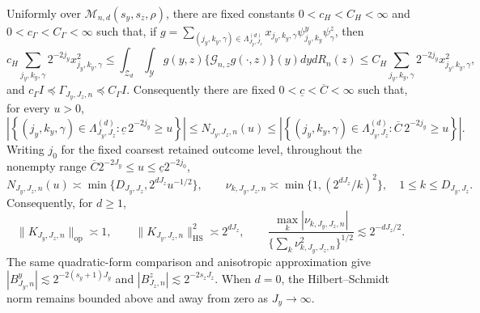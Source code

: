 Uniformly over \(\mathcal M_{n,d}(s_y,s_z,\rho)\), there are fixed constants \(0<c_H<C_H<\infty\) and \(0<c_\Gamma<C_\Gamma<\infty\) such that, if \(g=\sum_{(j_y,k_y,\gamma)\in\Lambda_{J_y,J_z}^{(d)}}x_{j_y,k_y,\gamma}\psi^y_{j_y,k_y}\psi^z_\gamma\), then
\[
c_H\sum_{j_y,k_y,\gamma}2^{-2j_y}x_{j_y,k_y,\gamma}^2
\le\int_{\mathcal Z_d}\int_{\mathcal Y}g(y,z)\{\mathcal G_{n,z}g(\cdot,z)\}(y)dydR_n(z)
\le C_H\sum_{j_y,k_y,\gamma}2^{-2j_y}x_{j_y,k_y,\gamma}^2,
\]
and \(c_\Gamma I\preceq\Gamma_{J_y,J_z,n}\preceq C_\Gamma I\). Consequently there are fixed \(0<\underline c<\overline C<\infty\) such that, for every \(u>0\),
\[
\left|\left\{(j_y,k_y,\gamma)\in\Lambda_{J_y,J_z}^{(d)}:\underline c\,2^{-2j_y}\ge u\right\}\right|
\le N_{J_y,J_z,n}(u)
\le
\left|\left\{(j_y,k_y,\gamma)\in\Lambda_{J_y,J_z}^{(d)}:\overline C\,2^{-2j_y}\ge u\right\}\right|.
\]
Writing \(j_0\) for the fixed coarsest retained outcome level, throughout the nonempty range \(\overline C2^{-2J_y}\le u\le\underline c2^{-2j_0}\),
\[
N_{J_y,J_z,n}(u)\asymp\min\{D_{J_y,J_z},2^{dJ_z}u^{-1/2}\},
\qquad
\nu_{k,J_y,J_z,n}\asymp\min\{1,(2^{dJ_z}/k)^2\},\quad 1\le k\le D_{J_y,J_z}.
\]
Consequently, for \(d\ge1\),
\[
\|K_{J_y,J_z,n}\|_{\mathrm{op}}\asymp1,
\qquad \|K_{J_y,J_z,n}\|_{\mathrm{HS}}^2\asymp2^{dJ_z},
\qquad
\frac{\max_k|\nu_{k,J_y,J_z,n}|}{\{\sum_k\nu_{k,J_y,J_z,n}^2\}^{1/2}}
\lesssim2^{-dJ_z/2}.
\]
The same quadratic-form comparison and anisotropic approximation give \(|B^y_{J_y,n}|\lesssim2^{-2(s_y+1)J_y}\) and \(|B^z_{J_z,n}|\lesssim2^{-2s_zJ_z}\). When \(d=0\), the Hilbert--Schmidt norm remains bounded above and away from zero as \(J_y\to\infty\).